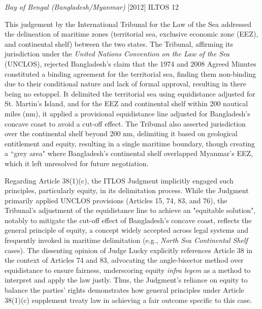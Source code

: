 \begin{casedetails}{\textit{Bay of Bengal (Bangladesh/Myanmar)} [2012] ILTOS 12}
    \flushleft

    This judgement by the International Tribunal for the Law of the Sea addressed the delineation of maritime zones (territorial sea, exclusive economic zone (EEZ), and continental shelf) between the two states. The Tribunal, affirming its jurisdiction under the \textit{United Nations Convention on the Law of the Sea} (UNCLOS), rejected Bangladesh's claim that the 1974 and 2008 Agreed Minutes constituted a binding agreement for the territorial sea, finding them non-binding due to their conditional nature and lack of formal approval, resulting in there being no estoppel. It delimited the territorial sea using equidistance adjusted for St. Martin's Island, and for the EEZ and continental shelf within 200 nautical miles (nm), it applied a provisional equidistance line adjusted for Bangladesh's concave coast to avoid a cut-off effect. The Tribunal also asserted jurisdiction over the continental shelf beyond 200 nm, delimiting it based on geological entitlement and equity, resulting in a single maritime boundary, though creating a ``grey area" where Bangladesh's continental shelf overlapped Myanmar's EEZ, which it left unresolved for future negotiation.

    \vspace{\baselineskip}

    Regarding Article 38(1)(c), the ITLOS Judgment implicitly engaged such principles, particularly equity, in its delimitation process. While the Judgment primarily applied UNCLOS provisions (Articles 15, 74, 83, and 76), the Tribunal's adjustment of the equidistance line to achieve an "equitable solution", notably to mitigate the cut-off effect of Bangladesh's concave coast, reflects the general principle of equity, a concept widely accepted across legal systems and frequently invoked in maritime delimitation (e.g., \textit{North Sea Continental Shelf} cases). The dissenting opinion of Judge Lucky explicitly references Article 38 in the context of Articles 74 and 83, advocating the angle-bisector method over equidistance to ensure fairness, underscoring equity \textit{infra legem} as a method to interpret and apply the law justly. Thus, the Judgment's reliance on equity to balance the parties' rights demonstrates how general principles under Article 38(1)(c) supplement treaty law in achieving a fair outcome specific to this case.


\end{casedetails}
